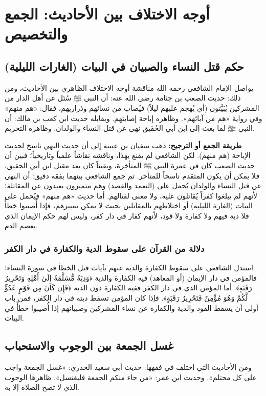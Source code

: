 \chapter{أوجه الاختلاف بين الأحاديث: الجمع والتخصيص}

\section{حكم قتل النساء والصبيان في البيات (الغارات الليلية)}
يواصل الإمام الشافعي رحمه الله مناقشة أوجه الاختلاف الظاهري بين الأحاديث، ومن ذلك:
حديث الصعب بن جثامة رضي الله عنه: أن النبي ﷺ سُئل عن أهل الدار من المشركين يُبَيَّتون (أي يُهجم عليهم ليلاً) فيُصاب من نسائهم وذراريهم، فقال: «هم منهم» وفي رواية «هم من آبائهم». وظاهره إباحة إصابتهم.
ويقابله حديث ابن كعب بن مالك: أن النبي ﷺ لما بعث إلى ابن أبي الحُقَيق نهى عن قتل النساء والولدان. وظاهره التحريم.

\textbf{طريقة الجمع أو الترجيح:}
ذهب سفيان بن عيينة إلى أن حديث النهي ناسخ لحديث الإباحة (هم منهم). لكن الشافعي لم يقنع بهذا، وناقشه نقاشاً علمياً وتاريخياً؛ فبين أن حديث الصعب كان في عمرة النبي ﷺ المتأخرة، ويقيناً كان بعد مقتل ابن أبي الحقيق، فلا يمكن أن يكون المتقدم ناسخاً للمتأخر. 
ثم جمع الشافعي بينهما بفقه دقيق: أن النهي عن قتل النساء والولدان يُحمل على (التعمد والقصد) وهم متميزون بعيدون عن المقاتلة؛ لأنهم لم يبلغوا كفراً يُقاتلون عليه، ولا معنى لقتالهم. أما حديث «هم منهم» فيُحمل على البيات (الغارة الليلية) أو اختلاطهم بالمقاتلين بحيث لا يمكن تمييزهم، فإذا أُصيبوا خطأً فلا دية فيهم ولا كفارة ولا قود، لأنهم كفار في دار كفر، وليس لهم حكم الإيمان الذي يعصم الدم.

\subsection{دلالة من القرآن على سقوط الدية والكفارة في دار الكفر}
استدل الشافعي على سقوط الكفارة والدية عنهم بآيات قتل الخطأ في سورة النساء؛ فالمؤمن في دار الإيمان (أو المعاهد) فيه الكفارة والدية ﴿وَدِيَةٌ مُّسَلَّمَةٌ إِلَىٰ أَهْلِهِ وَتَحْرِيرُ رَقَبَةٍ﴾. أما المؤمن الذي في دار الكفر ففيه الكفارة دون الدية ﴿فَإِن كَانَ مِن قَوْمٍ عَدُوٍّ لَّكُمْ وَهُوَ مُؤْمِنٌ فَتَحْرِيرُ رَقَبَةٍ﴾. فإذا كان المؤمن تسقط ديته في دار الكفر، فمن باب أولى أن يسقط القود والدية والكفارة عن نساء المشركين وصبيانهم إذا أُصيبوا خطأً في البيات.

\section{غسل الجمعة بين الوجوب والاستحباب}
ومن الأحاديث التي اختلف في فقهها:
حديث أبي سعيد الخدري: «غسل الجمعة واجب على كل محتلم». وحديث ابن عمر: «من جاء منكم الجمعة فليغتسل». ظاهرها الوجوب الذي لا تصح الصلاة إلا به.

